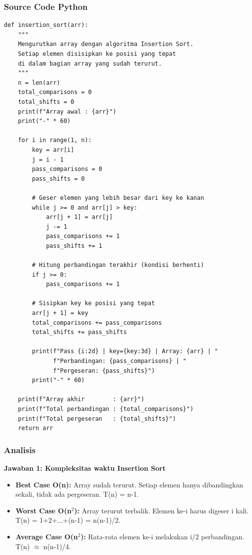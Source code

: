 \subsubsection*{Source Code Python}
\begin{lstlisting}[basicstyle=\ttfamily\scriptsize, frame=single, backgroundcolor=\color{white}, numbers=none, keywordstyle=\color{black}, commentstyle=\color{black}, stringstyle=\color{black}, breaklines=true]
def insertion_sort(arr):
    """
    Mengurutkan array dengan algoritma Insertion Sort.
    Setiap elemen disisipkan ke posisi yang tepat
    di dalam bagian array yang sudah terurut.
    """
    n = len(arr)
    total_comparisons = 0
    total_shifts = 0
    print(f"Array awal : {arr}")
    print("-" * 60)

    for i in range(1, n):
        key = arr[i]
        j = i - 1
        pass_comparisons = 0
        pass_shifts = 0

        # Geser elemen yang lebih besar dari key ke kanan
        while j >= 0 and arr[j] > key:
            arr[j + 1] = arr[j]
            j -= 1
            pass_comparisons += 1
            pass_shifts += 1

        # Hitung perbandingan terakhir (kondisi berhenti)
        if j >= 0:
            pass_comparisons += 1

        # Sisipkan key ke posisi yang tepat
        arr[j + 1] = key
        total_comparisons += pass_comparisons
        total_shifts += pass_shifts

        print(f"Pass {i:2d} | key={key:3d} | Array: {arr} | "
              f"Perbandingan: {pass_comparisons} | "
              f"Pergeseran: {pass_shifts}")
        print("-" * 60)

    print(f"Array akhir        : {arr}")
    print(f"Total perbandingan : {total_comparisons}")
    print(f"Total pergeseran   : {total_shifts}")
    return arr
\end{lstlisting}

\subsubsection*{Analisis}
\textbf{Jawaban 1: Kompleksitas waktu Insertion Sort}
\begin{itemize}
    \item \textbf{Best Case O(n):} Array sudah terurut. Setiap elemen hanya dibandingkan sekali, tidak ada pergeseran. T(n) = n-1.
    \item \textbf{Worst Case O(n$^2$):} Array terurut terbalik. Elemen ke-i harus digeser i kali. T(n) = 1+2+...+(n-1) = n(n-1)/2.
    \item \textbf{Average Case O(n$^2$):} Rata-rata elemen ke-i melakukan i/2 perbandingan. T(n) $\approx$ n(n-1)/4.
\end{itemize}

